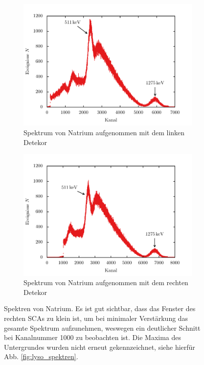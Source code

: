 \documentclass[11pt, a4paper]{article}
\numberwithin{equation}{section}
\begin{document}
\begin{figure}[htbp]
	\begin{subfigure}{\textwidth}
		\centering
		\includegraphics[width=\textwidth]{./figures/na_links}
		\caption{Spektrum von Natrium aufgenommen mit dem linken Detekor}
	\end{subfigure}
	\begin{subfigure}{\textwidth}
		\centering
		\includegraphics[width=\textwidth]{./figures/na_rechts}
		\caption{Spektrum von Natrium aufgenommen mit dem rechten Detekor}
	\end{subfigure}
	\caption{Spektren von Natrium. Es ist gut sichtbar, dass das Fenster des rechten SCAs zu klein ist, um bei minimaler Verstärkung das gesamte Spektrum aufzunehmen, weswegen ein deutlicher Schnitt bei Kanalnummer \num{1000} zu beobachten ist. Die Maxima des Untergrundes wurden nicht erneut gekennzeichnet, siehe hierfür Abb. \ref{fig:lyso_spektren}.}
	\label{fig:na_spektren}
\end{figure}
\end{document}
